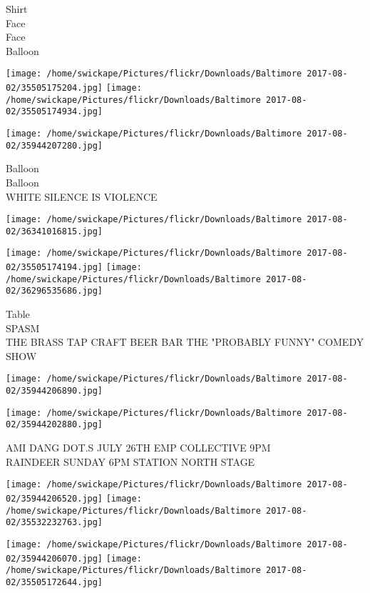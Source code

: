 \documentclass[10pt,letterpaper]{article}
\begin{document}
Shirt\\
Face\\
Face\\
Balloon\\
\pagebreak

\texttt{[image: /home/swickape/Pictures/flickr/Downloads/Baltimore 2017-08-02/35505175204.jpg]}
\texttt{[image: /home/swickape/Pictures/flickr/Downloads/Baltimore 2017-08-02/35505174934.jpg]}

\texttt{[image: /home/swickape/Pictures/flickr/Downloads/Baltimore 2017-08-02/35944207280.jpg]}

Balloon\\
Balloon\\
WHITE SILENCE IS VIOLENCE\\
\pagebreak

\texttt{[image: /home/swickape/Pictures/flickr/Downloads/Baltimore 2017-08-02/36341016815.jpg]}

\vspace{0.25in}
\texttt{[image: /home/swickape/Pictures/flickr/Downloads/Baltimore 2017-08-02/35505174194.jpg]}
\texttt{[image: /home/swickape/Pictures/flickr/Downloads/Baltimore 2017-08-02/36296535686.jpg]}

Table\\
SPASM\\
THE BRASS TAP CRAFT BEER BAR THE "PROBABLY FUNNY" COMEDY SHOW\\
\pagebreak

\texttt{[image: /home/swickape/Pictures/flickr/Downloads/Baltimore 2017-08-02/35944206890.jpg]}

\vspace{0.25in}
\texttt{[image: /home/swickape/Pictures/flickr/Downloads/Baltimore 2017-08-02/35944202880.jpg]}

AMI DANG DOT.S JULY 26TH EMP COLLECTIVE 9PM\\
RAINDEER SUNDAY 6PM STATION NORTH STAGE\\
\pagebreak

\texttt{[image: /home/swickape/Pictures/flickr/Downloads/Baltimore 2017-08-02/35944206520.jpg]}
\texttt{[image: /home/swickape/Pictures/flickr/Downloads/Baltimore 2017-08-02/35532232763.jpg]}

\texttt{[image: /home/swickape/Pictures/flickr/Downloads/Baltimore 2017-08-02/35944206070.jpg]}
\texttt{[image: /home/swickape/Pictures/flickr/Downloads/Baltimore 2017-08-02/35505172644.jpg]}
\end{document}
